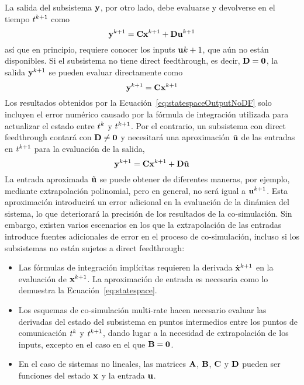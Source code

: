 La salida del subsistema $\mathbf{y}$, por otro lado, debe evaluarse y devolverse en el tiempo $t^{k + 1}$ como
%
\begin{equation}
	\mathbf{y}^{k + 1} = \mathbf{C} \mathbf{ x }^{k + 1} + \mathbf{D} \mathbf{u}^{k + 1}
	\label{eq:statespaceOutput}
\end{equation}
%
así que en principio, requiere conocer los inputs $\mathbf{u}{k + 1}$, que aún no están disponibles.
Si el subsistema no tiene direct feedthrough, es decir, $\mathbf{D} = \mathbf{0}$, la salida $\mathbf{y}^{k + 1}$ se pueden evaluar directamente como
%
\begin{equation}
	\mathbf{y}^{k + 1} = \mathbf{C} \mathbf{ x }^{k + 1}
	\label{eq:statespaceOutputNoDF}
\end{equation}
%
Los resultados obtenidos por la Ecuación~\eqref{eq:statespaceOutputNoDF} solo incluyen el error numérico causado por la fórmula de integración utilizada para actualizar el estado entre $t^{k}$ y $t^{k + 1}$.
Por el contrario, un subsistema con direct feedthrough contará con $\mathbf{D} \neq \mathbf{0}$ y necesitará una aproximación $\tilde{\mathbf{u}}$ de las entradas en $t^{k + 1}$ para la evaluación de la salida,
%
\begin{equation}
	\mathbf{y}^{k + 1} = \mathbf{C} \mathbf{ x }^{k + 1} + \mathbf{D} \tilde{\mathbf{u}}
	\label{eq:statespaceOutputApprox}
\end{equation}
%
La entrada aproximada $\tilde{\mathbf{u}}$ se puede obtener de diferentes maneras, por ejemplo, mediante extrapolación polinomial, pero en general, no será igual a $\mathbf{u}^{k + 1}$.
Esta aproximación introducirá un error adicional en la evaluación de la dinámica del sistema, lo que deteriorará la precisión de los resultados de la co-simulación.
Sin embargo, existen varios escenarios en los que la extrapolación de las entradas introduce fuentes adicionales de error en el proceso de co-simulación, incluso si los subsistemas no están sujetos a direct feedthrough:
\begin{itemize}
	\item{
		Las fórmulas de integración implícitas requieren la derivada $\dot{\mathbf{ x }}^{k + 1}$ en la evaluación de $\mathbf{ x } ^{k + 1}$.
        La aproximación de entrada es necesaria como lo demuestra la Ecuación~\eqref{eq:statespace}.
	} 
	\item{
	    Los esquemas de co-simulación multi-rate hacen necesario evaluar las derivadas del estado del subsistema en puntos intermedios entre los puntos de comunicación $t^{k}$ y $t^{k + 1}$, dando lugar a la necesidad de extrapolación de los inputs, excepto en el caso en el que $\mathbf{B} = \mathbf{0}$.
	}
	\item{
	    En el caso de sistemas no lineales, las matrices $\mathbf{A}$, $\mathbf{B}$, $\mathbf{C}$ y $\mathbf{D}$ pueden ser funciones del estado $\mathbf{ x }$ y la entrada $\mathbf{u}$.
	}
\end{itemize}
